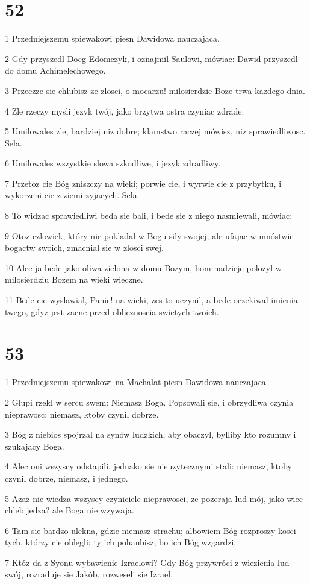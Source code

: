 \chapter{52}

\par 1 Przedniejszemu spiewakowi piesn Dawidowa nauczajaca.
\par 2 Gdy przyszedl Doeg Edomczyk, i oznajmil Saulowi, mówiac: Dawid przyszedl do domu Achimelechowego.
\par 3 Przeczze sie chlubisz ze zlosci, o mocarzu! milosierdzie Boze trwa kazdego dnia.
\par 4 Zle rzeczy mysli jezyk twój, jako brzytwa ostra czyniac zdrade.
\par 5 Umilowales zle, bardziej niz dobre; klamstwo raczej mówisz, niz sprawiedliwosc. Sela.
\par 6 Umilowales wszystkie slowa szkodliwe, i jezyk zdradliwy.
\par 7 Przetoz cie Bóg zniszczy na wieki; porwie cie, i wyrwie cie z przybytku, i wykorzeni cie z ziemi zyjacych. Sela.
\par 8 To widzac sprawiedliwi beda sie bali, i bede sie z niego nasmiewali, mówiac:
\par 9 Otoz czlowiek, który nie pokladal w Bogu sily swojej; ale ufajac w mnóstwie bogactw swoich, zmacnial sie w zlosci swej.
\par 10 Alec ja bede jako oliwa zielona w domu Bozym, bom nadzieje polozyl w milosierdziu Bozem na wieki wieczne.
\par 11 Bede cie wyslawial, Panie! na wieki, zes to uczynil, a bede oczekiwal imienia twego, gdyz jest zacne przed oblicznoscia swietych twoich.

\chapter{53}

\par 1 Przedniejszemu spiewakowi na Machalat piesn Dawidowa nauczajaca.
\par 2 Glupi rzekl w sercu swem: Niemasz Boga. Popsowali sie, i obrzydliwa czynia nieprawosc; niemasz, ktoby czynil dobrze.
\par 3 Bóg z niebios spojrzal na synów ludzkich, aby obaczyl, bylliby kto rozumny i szukajacy Boga.
\par 4 Alec oni wszyscy odstapili, jednako sie nieuzytecznymi stali: niemasz, ktoby czynil dobrze, niemasz, i jednego.
\par 5 Azaz nie wiedza wszyscy czyniciele nieprawosci, ze pozeraja lud mój, jako wiec chleb jedza? ale Boga nie wzywaja.
\par 6 Tam sie bardzo ulekna, gdzie niemasz strachu; albowiem Bóg rozproszy kosci tych, którzy cie oblegli; ty ich pohanbisz, bo ich Bóg wzgardzi.
\par 7 Któz da z Syonu wybawienie Izraelowi? Gdy Bóg przywróci z wiezienia lud swój, rozraduje sie Jakób, rozweseli sie Izrael.

